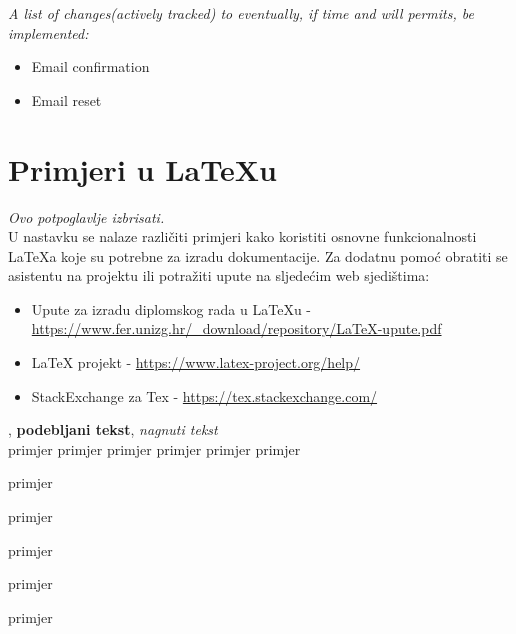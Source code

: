 	\textit{A list of changes(actively tracked) to eventually, if time and will permits, be implemented:}
	\begin{itemize}
		\item Email confirmation
		\item Email reset
	\end{itemize}


\section{Primjeri u LaTeXu}

\textit{Ovo potpoglavlje izbrisati.}\\

U nastavku se nalaze različiti primjeri kako koristiti osnovne funkcionalnosti LaTeXa koje su potrebne za izradu dokumentacije. Za dodatnu pomoć obratiti se asistentu na projektu ili potražiti upute na sljedećim web sjedištima:
\begin{itemize}
	\item Upute za izradu diplomskog rada u LaTeXu - \url{https://www.fer.unizg.hr/_download/repository/LaTeX-upute.pdf}
	\item LaTeX projekt - \url{https://www.latex-project.org/help/}
	\item StackExchange za Tex - \url{https://tex.stackexchange.com/}\\
	
\end{itemize} 	




, 
\textbf{podebljani tekst}, 
\textit{nagnuti tekst}\\
\normalsize primjer
\large primjer
\Large primjer
\LARGE {primjer}
\huge {primjer}
\Huge primjer
\normalsize

\begin{packed_item}
	
	\item  primjer
	\item  primjer
	\item  primjer
	\item[] \begin{packed_enum}
		
		\item primjer
		\item primjer
	\end{packed_enum}
	
\end{packed_item}

